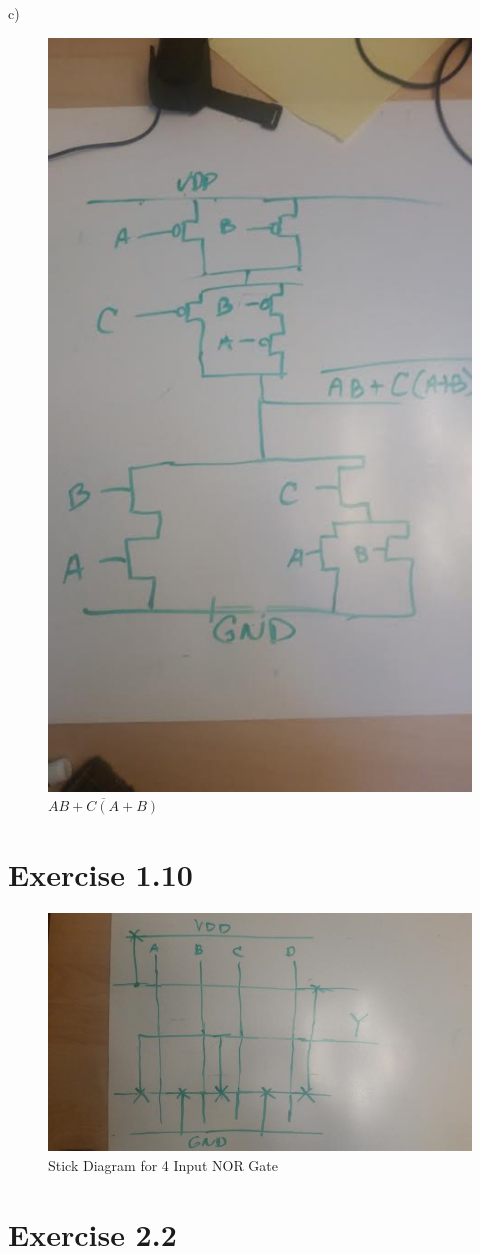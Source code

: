 \documentclass[11pt]{article}
\begin{document}
c)
\begin{figure}[H]
\centering
\includegraphics[width=0.5\linewidth]{1-6c}
\caption{$\overline{AB+C(A+B)}$}
\label{fig:1-6c}
\end{figure}
\section{Exercise 1.10}
\begin{figure}[H]
\centering
\includegraphics[width=1\linewidth]{1-10}
\caption{Stick Diagram for 4 Input NOR Gate}
\label{fig:1-10}
\end{figure}
\section{Exercise 2.2}
\end{document}
